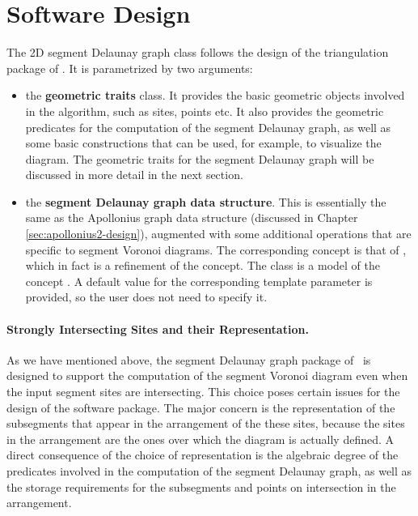 \section{Software Design}
\label{sec:sdg2-design}

The 2D segment Delaunay graph class
follows the design of the triangulation package of \cgal. It is
parametrized by two arguments:
\begin{itemize}
\item the {\bf geometric traits} class. It provides the basic
  geometric objects involved in the algorithm, such as sites, points
  etc. It also provides the geometric predicates for the computation
  of the segment Delaunay graph, as well as some basic constructions
  that can be used, for example, to visualize the diagram.
  The geometric traits for the segment Delaunay graph will be
  discussed in more detail in the next section.
\item the {\bf segment Delaunay graph data structure}. This is
  essentially the same as the Apollonius graph data structure (discussed
  in Chapter \ref{sec:apollonius2-design}), augmented with some
  additional operations that are specific to segment Voronoi
  diagrams. The corresponding concept is that of
  , which in fact is a refinement
  of the  concept. The class
   is a model of
  the concept . A default value
  for the corresponding template parameter is provided, so the user
  does not need to specify it.
\end{itemize}


\paragraph{Strongly Intersecting Sites and their Representation.}
As we have mentioned above, the segment Delaunay graph package of
\cgal\ is designed to support the computation of the segment Voronoi
diagram even when the input segment sites are intersecting. This
choice poses certain issues for the design of the software
package. The major concern is the representation of the subsegments
that appear in the arrangement of the these sites, because the sites
in the arrangement are the ones over which the diagram is actually
defined. A direct consequence of the choice of representation is the
algebraic degree of the predicates involved in the computation of the
segment Delaunay graph, as well as the storage requirements for the
subsegments and points on intersection in the arrangement.

